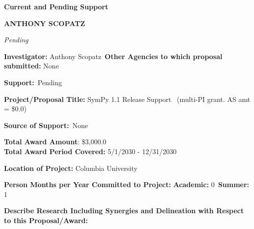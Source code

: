 \documentclass[prl,tighten,amsmath,amssymb,floatfix]{revtex4-1}
\begin{document}
\textbf{Current and Pending Support}

\textbf{ANTHONY SCOPATZ}
\vskip 14pt


\textit{Pending}

\vskip 12pt\noindent
\textbf{Investigator:} Anthony Scopatz\
\textbf{Other Agencies to which proposal submitted:}
None

\textbf{Support:}\ Pending

\textbf{Project/Proposal Title:}  SymPy 1.1 Release Support
\ (multi-PI grant.  AS
amt = \$0.0)

\textbf{Source of Support:}\
None

\textbf{Total Award Amount}:
\$3,000.0\\
\textbf{ Total Award Period Covered:}
5/1/2030 - 12/31/2030

\textbf{Location of Project:} Columbia University

\textbf{Person Months per Year Committed to Project:}
\textbf{Academic:} 0\
\textbf{Summer:} 1

\textbf{Describe Research Including Synergies and Delineation with
Respect to this Proposal/Award:}

\vskip 14pt
\vskip 14pt
\end{document}
